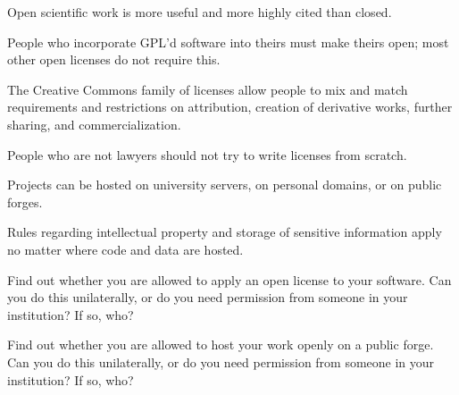 \begin{keypoints}
\begin{swcitemize}
\item
  Open scientific work is more useful and more highly cited than closed.
\item
  People who incorporate GPL'd software into theirs must make theirs
  open; most other open licenses do not require this.
\item
  The Creative Commons family of licenses allow people to mix and match
  requirements and restrictions on attribution, creation of derivative
  works, further sharing, and commercialization.
\item
  People who are not lawyers should not try to write licenses from
  scratch.
\item
  Projects can be hosted on university servers, on personal domains, or
  on public forges.
\item
  Rules regarding intellectual property and storage of sensitive
  information apply no matter where code and data are hosted.
\end{swcitemize}
\end{keypoints}

\begin{challenge}
  Find out whether you are allowed to apply an open license to your
  software. Can you do this unilaterally, or do you need permission from
  someone in your institution? If so, who?
\end{challenge}

\begin{challenge}
  Find out whether you are allowed to host your work openly on a public
  forge. Can you do this unilaterally, or do you need permission from
  someone in your institution? If so, who?
\end{challenge}
